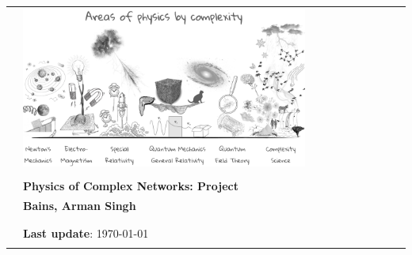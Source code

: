 \begin{center}
\begin{spacing}{1.3}
\begin{tabular}{p{4cm} ll}
&  \includegraphics[width=0.77\textwidth]{images/areas_of_physics.png} \\\\
& \textcolor{unipd}{\textbf{\huge Physics of Complex Networks: Project}}\\ %
& \textbf{Bains, Arman Singh}\\
& \\
& \\
& \scriptsize \textbf{Last update}: \today\\\\
\end{tabular}

\end{spacing}

\end{center}



\thispagestyle{empty} %
\clearpage\setcounter{page}{1} %

